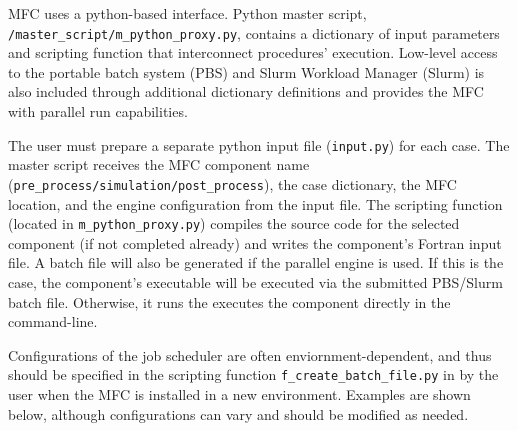 \documentclass[11pt]{article}
\begin{document}
MFC uses a python-based interface.
Python master script, \texttt{/master_script/m_python_proxy.py}, contains a dictionary of input parameters and scripting function that interconnect procedures' execution.
Low-level access to the portable batch system (PBS) and Slurm Workload Manager (Slurm) is also included through additional dictionary definitions and provides the MFC with parallel run capabilities.

The user must prepare a separate python input file (\texttt{input.py}) for each case.
The master script receives the MFC component name (\texttt{pre_process/simulation/post_process}), the case dictionary, the MFC location, and the engine configuration from the input file.
The scripting function (located in \texttt{m_python_proxy.py}) compiles the source code for the selected component (if not completed already) and writes the component's Fortran input file.
A batch file will also be generated if the parallel engine is used.
If this is the case, the component's executable will be executed via the submitted PBS/Slurm batch file.
Otherwise, it runs the executes the component directly in the command-line.

Configurations of the job scheduler are often enviornment-dependent, and thus should be specified in the scripting function \texttt{f_create_batch_file.py} in by the user when the MFC is installed in a new environment.
Examples are shown below, although configurations can vary and should be modified as needed.
\end{document}
